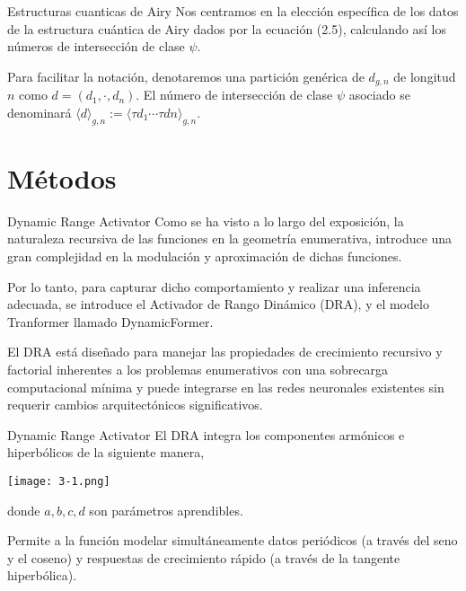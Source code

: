 \documentclass{beamer}
\begin{document}
\begin{frame}{Estructuras cuanticas de Airy}
    Nos centramos en la elección específica de los datos de la estructura cuántica de Airy dados por la ecuación (2.5), calculando así los números de intersección de clase $\psi$. 
    \newline
    \pause
    
    Para facilitar la notación, denotaremos una partición genérica de $d_{g,n}$ de longitud $n$ como $d = (d_1,\cdot, d_n)$. El número de intersección de clase $\psi$ asociado se denominará $⟨d⟩_{g,n} := \langle\tau d_1 \cdots τdn \rangle_{g,n}$.
\end{frame}


\section{Métodos}
\begin{frame}{Dynamic Range Activator}
    Como se ha visto a lo largo del exposición, la naturaleza recursiva de las funciones en la geometría enumerativa, introduce una gran complejidad en la modulación y aproximación de dichas funciones.
    \newline
    \pause
    
    Por lo tanto, para capturar dicho comportamiento y realizar una inferencia adecuada, se introduce el Activador de Rango Dinámico (DRA), y el modelo Tranformer llamado DynamicFormer. 
    \newline
    \pause
    
    El DRA está diseñado para manejar las propiedades de crecimiento recursivo y factorial inherentes a los problemas enumerativos con una sobrecarga computacional mínima y puede integrarse en las redes neuronales existentes sin requerir cambios arquitectónicos significativos.
\end{frame}

\begin{frame}{Dynamic Range Activator}
    El DRA integra los componentes armónicos e hiperbólicos de la siguiente manera,
    \newline
    \pause
    
    \texttt{[image: 3-1.png]}

    donde $a, b, c, d$ son parámetros aprendibles. 
    \newline
    \pause
    
    Permite a la función modelar simultáneamente datos periódicos (a través del seno y el coseno) y respuestas de crecimiento rápido (a través de la tangente hiperbólica). 
\end{frame}
\end{document}
